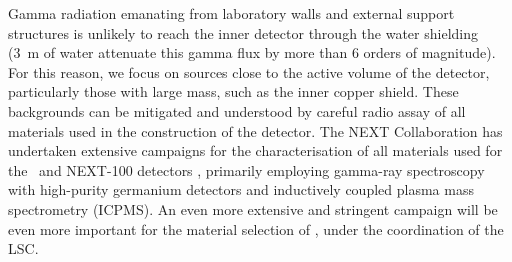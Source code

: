 \indent

Gamma radiation emanating from laboratory walls and external support structures is unlikely to reach the inner detector through the water shielding (3~m of water attenuate this gamma flux by more than 6 orders of magnitude). For this reason, we focus on sources close to the active volume of the detector, particularly those with large mass, such as the inner copper shield. These backgrounds can be mitigated and understood by careful radio assay of all materials used in the construction of the detector. The NEXT Collaboration has undertaken extensive campaigns for the characterisation of all materials used for the \NEW\ and NEXT-100 detectors \cite{Alvarez:2012as, Cebrian:2017jzb}, primarily employing gamma-ray spectroscopy with high-purity germanium detectors and inductively coupled plasma mass spectrometry (ICPMS). An even more extensive and stringent campaign will be even more important for the material selection of \NHD, under the coordination of the LSC.  



\indent

